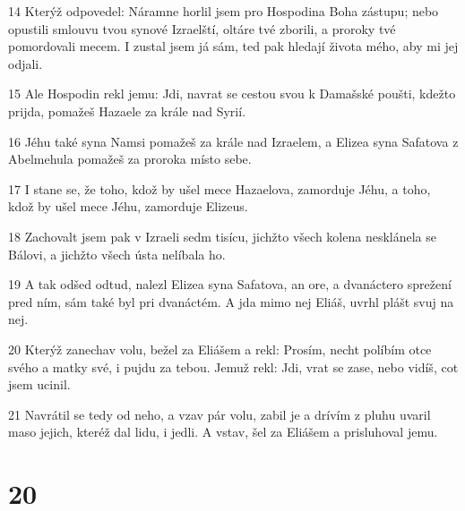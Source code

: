 \par 14 Kterýž odpovedel: Náramne horlil jsem pro Hospodina Boha zástupu; nebo opustili smlouvu tvou synové Izraelští, oltáre tvé zborili, a proroky tvé pomordovali mecem. I zustal jsem já sám, ted pak hledají života mého, aby mi jej odjali.
\par 15 Ale Hospodin rekl jemu: Jdi, navrat se cestou svou k Damašské poušti, kdežto prijda, pomažeš Hazaele za krále nad Syrií.
\par 16 Jéhu také syna Namsi pomažeš za krále nad Izraelem, a Elizea syna Safatova z Abelmehula pomažeš za proroka místo sebe.
\par 17 I stane se, že toho, kdož by ušel mece Hazaelova, zamorduje Jéhu, a toho, kdož by ušel mece Jéhu, zamorduje Elizeus.
\par 18 Zachovalt jsem pak v Izraeli sedm tisícu, jichžto všech kolena nesklánela se Bálovi, a jichžto všech ústa nelíbala ho.
\par 19 A tak odšed odtud, nalezl Elizea syna Safatova, an ore, a dvanáctero sprežení pred ním, sám také byl pri dvanáctém. A jda mimo nej Eliáš, uvrhl plášt svuj na nej.
\par 20 Kterýž zanechav volu, bežel za Eliášem a rekl: Prosím, necht políbím otce svého a matky své, i pujdu za tebou. Jemuž rekl: Jdi, vrat se zase, nebo vidíš, cot jsem ucinil.
\par 21 Navrátil se tedy od neho, a vzav pár volu, zabil je a drívím z pluhu uvaril maso jejich, kteréž dal lidu, i jedli. A vstav, šel za Eliášem a prisluhoval jemu.

\chapter{20}

